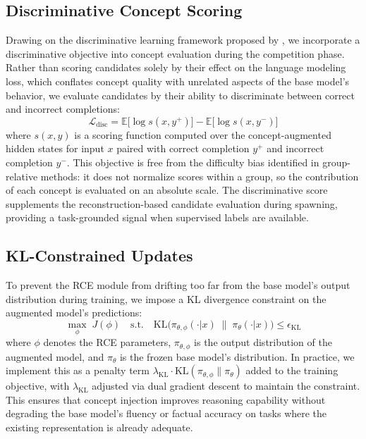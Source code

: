 \documentclass[11pt]{article}
\begin{document}
\subsection{Discriminative Concept Scoring}

Drawing on the discriminative learning framework proposed by \citet{zhang2025disco}, we incorporate a discriminative objective into concept evaluation during the competition phase. Rather than scoring candidates solely by their effect on the language modeling loss, which conflates concept quality with unrelated aspects of the base model's behavior, we evaluate candidates by their ability to discriminate between correct and incorrect completions:
\begin{equation}
\mathcal{L}_{\text{disc}} = \mathbb{E}\big[\log s(x, y^+)\big] - \mathbb{E}\big[\log s(x, y^-)\big]
\label{eq:disc}
\end{equation}
where $s(x, y)$ is a scoring function computed over the concept-augmented hidden states for input $x$ paired with correct completion $y^+$ and incorrect completion $y^-$. This objective is free from the difficulty bias identified in group-relative methods: it does not normalize scores within a group, so the contribution of each concept is evaluated on an absolute scale. The discriminative score supplements the reconstruction-based candidate evaluation during spawning, providing a task-grounded signal when supervised labels are available.

\subsection{KL-Constrained Updates}

To prevent the RCE module from drifting too far from the base model's output distribution during training, we impose a KL divergence constraint on the augmented model's predictions:
\begin{equation}
\max_{\phi}\; J(\phi) \quad \text{s.t.} \quad \text{KL}\big(\pi_{\theta,\phi}(\cdot | x)\;\|\;\pi_{\theta}(\cdot | x)\big) \leq \epsilon_{\text{KL}}
\label{eq:kl_constraint}
\end{equation}
where $\phi$ denotes the RCE parameters, $\pi_{\theta,\phi}$ is the output distribution of the augmented model, and $\pi_\theta$ is the frozen base model's distribution. In practice, we implement this as a penalty term $\lambda_{\text{KL}} \cdot \text{KL}(\pi_{\theta,\phi} \| \pi_\theta)$ added to the training objective, with $\lambda_{\text{KL}}$ adjusted via dual gradient descent to maintain the constraint. This ensures that concept injection improves reasoning capability without degrading the base model's fluency or factual accuracy on tasks where the existing representation is already adequate.
\end{document}

